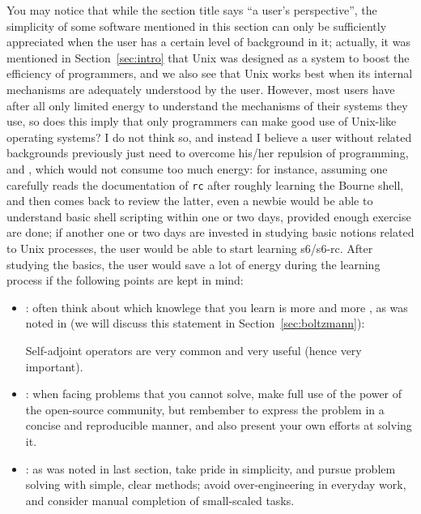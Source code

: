 You may notice that while the section title says ``a user's perspective'', the
simplicity of some software mentioned in this section can only be sufficiently
appreciated when the user has a certain level of background in it; actually,
it was mentioned in Section~\ref{sec:intro} that Unix was designed as a system
to boost the efficiency of programmers, and we also see that Unix works best
when its internal mechanisms are adequately understood by the user.  However,
most users have after all only limited energy to understand the mechanisms of
their systems they use, so does this imply that only programmers can make good
use of Unix-like operating systems?  I do not think so, and instead I believe
a user without related backgrounds previously just need to overcome his/her
repulsion of programming, and ,
which would not consume too much energy: for instance, assuming one carefully
reads the documentation of \verb|rc| after roughly learning the Bourne shell,
and then comes back to review the latter, even a newbie would be able to
understand basic shell scripting within one or two days, provided enough
exercise are done; if another one or two days are invested in studying basic
notions related to Unix processes, the user would be able to start learning
s6/s6-rc.  After studying the basics, the user would save a lot of energy
during the learning process if the following points are kept in mind:
\begin{itemize}
\item {}:
	often think about which knowlege that you learn is more 
	and more , as was noted in \parencite{dodson1991}
	(we will discuss this statement in Section~\ref{sec:boltzmann}):
\begin{quoting}
	Self-adjoint operators are very common
	and very useful (hence very important).
\end{quoting}
\item {}:
	when facing problems that you cannot solve, make full use of the power of
	the open-source community, but rembember to express the problem in a concise
	and reproducible manner, and also present your own efforts at solving it.
\item {}:
	as was noted in last section, take pride in simplicity, and pursue problem
	solving with simple, clear methods; avoid over-engineering in everyday
	work, and consider manual completion of small-scaled tasks.
\end{itemize}

